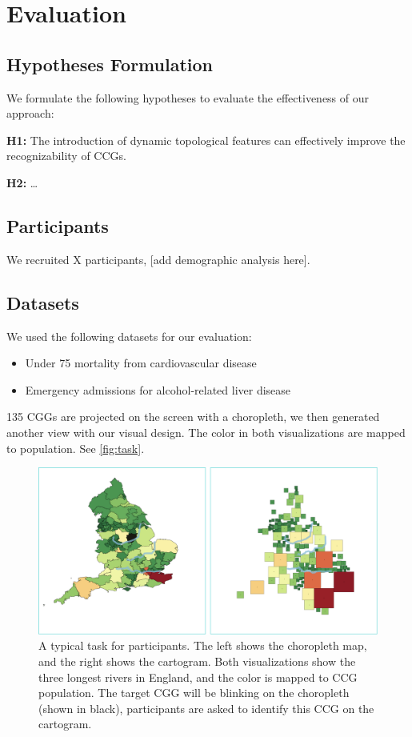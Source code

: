 \color{blue}

\section{Evaluation}

\subsection{Hypotheses Formulation}

We formulate the following hypotheses to evaluate the effectiveness of our approach:

\textbf{H1:} The introduction of dynamic topological features can effectively improve the recognizability of CCGs.

\textbf{H2:} \dots

\subsection{Participants}

We recruited X participants, [add demographic analysis here].

\subsection{Datasets}

We used the following datasets for our evaluation:

\begin{itemize}
    \item Under 75 mortality from cardiovascular disease
    \item Emergency admissions for alcohol-related liver disease
\end{itemize}

135 CGGs are projected on the screen with a choropleth, we then generated another view with our visual design. The color in both visualizations are mapped to population. See \autoref{fig:task}.

{
    \begin{figure}[tb!]
        \centering
        \includegraphics[width=\columnwidth,keepaspectratio]{figure/evaluation/task.png}
        \caption{A typical task for participants. The left shows the choropleth map, and the right shows the cartogram. Both visualizations show the three longest rivers in England, and the color is mapped to CCG population. The target CGG will be blinking on the choropleth (shown in black), participants are asked to identify this CCG on the cartogram.}
        \label{fig:task}
    \end{figure}
}

